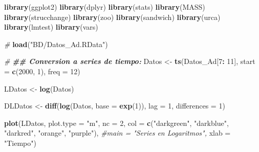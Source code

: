 \documentclass[
]{book}
\newenvironment{Shaded}{\begin{snugshade}}{\end{snugshade}}
\newcommand{\AttributeTok}[1]{\textcolor[rgb]{0.13,0.29,0.53}{#1}}
\newcommand{\CommentTok}[1]{\textcolor[rgb]{0.56,0.35,0.01}{\textit{#1}}}
\newcommand{\DecValTok}[1]{\textcolor[rgb]{0.00,0.00,0.81}{#1}}
\newcommand{\DocumentationTok}[1]{\textcolor[rgb]{0.56,0.35,0.01}{\textbf{\textit{#1}}}}
\newcommand{\FunctionTok}[1]{\textcolor[rgb]{0.13,0.29,0.53}{\textbf{#1}}}
\newcommand{\NormalTok}[1]{#1}
\newcommand{\OtherTok}[1]{\textcolor[rgb]{0.56,0.35,0.01}{#1}}
\newcommand{\SpecialCharTok}[1]{\textcolor[rgb]{0.81,0.36,0.00}{\textbf{#1}}}
\newcommand{\StringTok}[1]{\textcolor[rgb]{0.31,0.60,0.02}{#1}}
\begin{document}
\begin{Shaded}
\begin{Highlighting}[]
\FunctionTok{library}\NormalTok{(ggplot2)}
\FunctionTok{library}\NormalTok{(dplyr)}
\FunctionTok{library}\NormalTok{(stats)}
\FunctionTok{library}\NormalTok{(MASS)}
\FunctionTok{library}\NormalTok{(strucchange)}
\FunctionTok{library}\NormalTok{(zoo)}
\FunctionTok{library}\NormalTok{(sandwich)}
\FunctionTok{library}\NormalTok{(urca)}
\FunctionTok{library}\NormalTok{(lmtest)}
\FunctionTok{library}\NormalTok{(vars)}

\CommentTok{\#}
\FunctionTok{load}\NormalTok{(}\StringTok{"BD/Datos\_Ad.RData"}\NormalTok{)}

\CommentTok{\#}
\DocumentationTok{\#\# Conversion a series de tiempo:}
\NormalTok{Datos }\OtherTok{\textless{}{-}} \FunctionTok{ts}\NormalTok{(Datos\_Ad[}\DecValTok{7}\SpecialCharTok{:} \DecValTok{11}\NormalTok{], }
            \AttributeTok{start =} \FunctionTok{c}\NormalTok{(}\DecValTok{2000}\NormalTok{, }\DecValTok{1}\NormalTok{), }
            \AttributeTok{freq =} \DecValTok{12}\NormalTok{)}

\NormalTok{LDatos }\OtherTok{\textless{}{-}} \FunctionTok{log}\NormalTok{(Datos)}

\NormalTok{DLDatos }\OtherTok{\textless{}{-}} \FunctionTok{diff}\NormalTok{(}\FunctionTok{log}\NormalTok{(Datos, }\AttributeTok{base =} \FunctionTok{exp}\NormalTok{(}\DecValTok{1}\NormalTok{)), }
                \AttributeTok{lag =} \DecValTok{1}\NormalTok{, }
                \AttributeTok{differences =} \DecValTok{1}\NormalTok{)}
\end{Highlighting}
\end{Shaded}

\begin{Shaded}
\begin{Highlighting}[]
\FunctionTok{plot}\NormalTok{(LDatos, }
     \AttributeTok{plot.type =} \StringTok{"m"}\NormalTok{, }\AttributeTok{nc =} \DecValTok{2}\NormalTok{,}
     \AttributeTok{col =} \FunctionTok{c}\NormalTok{(}\StringTok{"darkgreen"}\NormalTok{, }\StringTok{"darkblue"}\NormalTok{, }\StringTok{"darkred"}\NormalTok{, }\StringTok{"orange"}\NormalTok{, }\StringTok{"purple"}\NormalTok{), }
     \CommentTok{\#main = "Series en Logaritmos", }
     \AttributeTok{xlab =} \StringTok{"Tiempo"}\NormalTok{)}
\end{Highlighting}
\end{Shaded}
\end{document}
